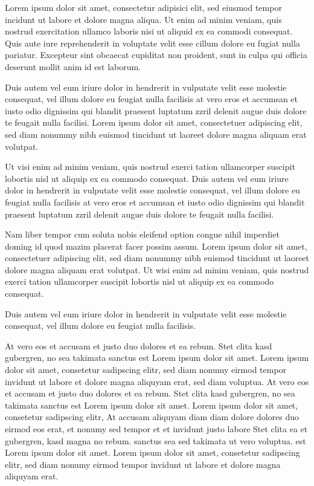\documentclass[twoside,a4paper]{article}
\begin{document}
Lorem ipsum dolor sit amet, consectetur adipisici elit, sed eiusmod tempor incidunt ut labore et dolore magna aliqua. Ut enim ad minim veniam, quis nostrud exercitation ullamco laboris nisi ut aliquid ex ea commodi consequat. Quis aute iure reprehenderit in voluptate velit esse cillum dolore eu fugiat nulla pariatur. Excepteur sint obcaecat cupiditat non proident, sunt in culpa qui officia deserunt mollit anim id est laborum.


Duis autem vel eum iriure dolor in hendrerit in vulputate velit esse molestie consequat, vel illum dolore eu feugiat nulla facilisis at vero eros et accumsan et iusto odio dignissim qui blandit praesent luptatum zzril delenit augue duis dolore te feugait nulla facilisi. Lorem ipsum dolor sit amet, consectetuer adipiscing elit, sed diam nonummy nibh euismod tincidunt ut laoreet dolore magna aliquam erat volutpat.

Ut visi enim ad minim veniam, quis nostrud exerci tation ullamcorper suscipit lobortis nisl ut aliquip ex ea commodo consequat. Duis autem vel eum iriure dolor in hendrerit in vulputate velit esse molestie consequat, vel illum dolore eu feugiat nulla facilisis at vero eros et accumsan et iusto odio dignissim qui blandit praesent luptatum zzril delenit augue duis dolore te feugait nulla facilisi.

Nam liber tempor cum soluta nobis eleifend option congue nihil imperdiet doming id quod mazim placerat facer possim assum. Lorem ipsum dolor sit amet, consectetuer adipiscing elit, sed diam nonummy nibh euismod tincidunt ut laoreet dolore magna aliquam erat volutpat. Ut wisi enim ad minim veniam, quis nostrud exerci tation ullamcorper suscipit lobortis nisl ut aliquip ex ea commodo consequat.

Duis autem vel eum iriure dolor in hendrerit in vulputate velit esse molestie consequat, vel illum dolore eu feugiat nulla facilisis.

At vero eos et accusam et justo duo dolores et ea rebum. Stet clita kasd gubergren, no sea takimata sanctus est Lorem ipsum dolor sit amet. Lorem ipsum dolor sit amet, consetetur sadipscing elitr, sed diam nonumy eirmod tempor invidunt ut labore et dolore magna aliquyam erat, sed diam voluptua. At vero eos et accusam et justo duo dolores et ea rebum. Stet clita kasd gubergren, no sea takimata sanctus est Lorem ipsum dolor sit amet. Lorem ipsum dolor sit amet, consetetur sadipscing elitr, At accusam aliquyam diam diam dolore dolores duo eirmod eos erat, et nonumy sed tempor et et invidunt justo labore Stet clita ea et gubergren, kasd magna no rebum. sanctus sea sed takimata ut vero voluptua. est Lorem ipsum dolor sit amet. Lorem ipsum dolor sit amet, consetetur sadipscing elitr, sed diam nonumy eirmod tempor invidunt ut labore et dolore magna aliquyam erat.
\end{document}
